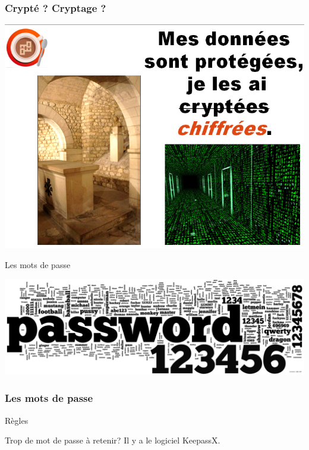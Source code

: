 \documentclass{beamer}
\begin{document}
\begin{frame}
\frametitle{Crypté ? Cryptage ?}
\begin{center}
\includegraphics[scale=0.5]{./images/chiffrees_vs_cryptees.png}
\end{center}
\end{frame}

\begin{frame}
\Huge{\centerline{Les mots de passe}}

\begin{center}
\includegraphics[scale=0.6] {./images/password.png}
\end{center}
\end{frame}

\begin{frame}
\frametitle{Les mots de passe}
\begin{block}{Règles}
\begin{itemize}
\end{itemize}
\end{block}
\begin{block}{Trop de mot de passe à retenir?}
Il y a le logiciel KeepassX.
\end{block}
\end{frame}
\end{document}
